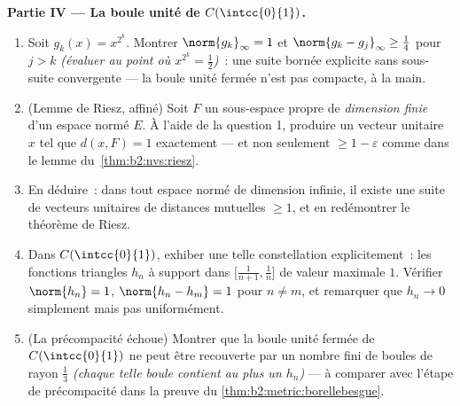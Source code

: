 \begin{problem}
\medskip
\noindent\textbf{Partie IV --- La boule unité de
$C(\intcc{0}{1})$.}
\begin{enumerate}[resume]
  \item Soit $g_k(x) = x^{2^k}$. Montrer $\norm{g_k}_\infty = 1$ et
        $\norm{g_k - g_j}_\infty \geq \frac14$ pour $j > k$
        \emph{(évaluer au point où $x^{2^k} =
        \frac12$)}~: une suite bornée explicite sans sous-suite
        convergente --- la boule unité fermée n'est pas
        compacte, à la main.
  \item (Lemme de Riesz, affiné) Soit $F$ un
        sous-espace propre de \emph{dimension finie} d'un espace normé
        $E$. À l'aide de la question 1, produire un vecteur unitaire $x$
        tel que $d(x, F) = 1$ exactement --- et non seulement $\geq 1 -
        \varepsilon$ comme dans le lemme du~\cref{thm:b2:nvs:riesz}.
  \item En déduire~: dans tout espace normé de dimension infinie, il
        existe une suite de vecteurs unitaires de distances
        mutuelles $\geq 1$, et en redémontrer le théorème de Riesz.
  \item Dans $C(\intcc{0}{1})$, exhiber une telle constellation
        explicitement~: les fonctions triangles $h_n$ à support dans
        $\bigl[\frac1{n+1}, \frac1n\bigr]$ de valeur maximale $1$.
        Vérifier $\norm{h_n} = 1$, $\norm{h_n - h_m} = 1$ pour $n
        \neq m$, et remarquer que $h_n \to 0$ simplement mais pas
        uniformément.
  \item (La précompacité échoue) Montrer que la boule unité
        fermée de $C(\intcc{0}{1})$ ne peut être recouverte par un
        nombre fini de boules de rayon $\frac13$ \emph{(chaque telle
        boule contient au plus un $h_n$)} --- à comparer avec
        l'étape de précompacité dans la preuve du
        \cref{thm:b2:metric:borellebesgue}.
\end{enumerate}


\end{problem}
